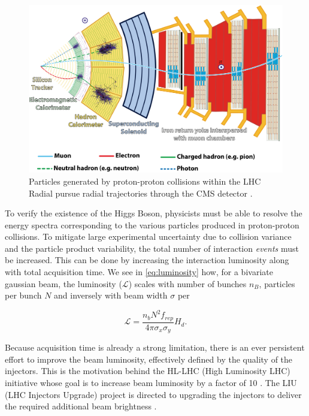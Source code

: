 \begin{figure}
    \centering
    \includegraphics{figs/CMSslice_whiteBackground.png}
    \caption{Particles generated by proton-proton collisions within the LHC Radial pursue radial trajectories through the CMS detector \cite{barney_cms_2016}.}
    \label{fig:cms}
\end{figure}

To verify the existence of the Higgs Boson, physicists must be able to resolve the energy spectra corresponding to the various particles produced in proton-proton collisions. To mitigate large experimental uncertainty due to collision variance and the particle product variability, the total number of interaction \textit{events} must be increased. This can be done by increasing the interaction luminosity along with total acquisition time. We see in \eqref{eq:luminosity} how, for a bivariate gaussian beam, the luminosity ($\mathcal{L}$) scales with number of bunches $n_B$, particles per bunch $N$ and inversely with beam width $\sigma$ per

\begin{equation}
    \mathcal{L} = \frac{n_b N^2f_{rep}}{4\pi\sigma_x\sigma_y}H_d
    \label{eq:luminosity}.
\end{equation}

Because acquisition time is already a strong limitation, there is an ever persistent effort to improve the beam luminosity, effectively defined by the quality of the injectors. This is the motivation behind the HL-LHC (High Luminosity LHC) initiative whose goal is to increase beam luminosity by a factor of 10 \cite{aberle_high-luminosity_2020}. The LIU (LHC Injectors Upgrade) project is directed to upgrading the injectors to deliver the required additional beam brightness \cite{damerau_lhc_2014}.

